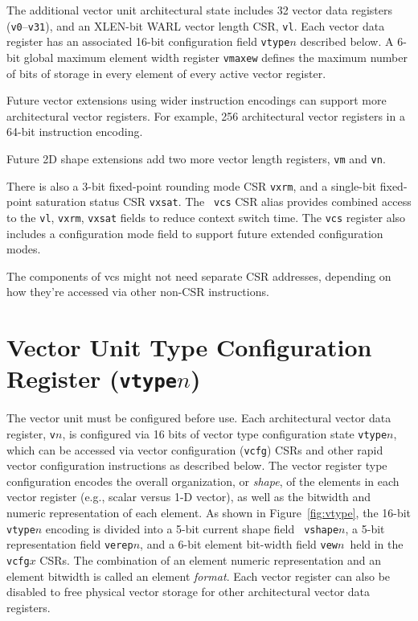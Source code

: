 The additional vector unit architectural state includes 32 vector data
registers ({\tt v0}--{\tt v31}), and an XLEN-bit WARL vector length
CSR, {\tt vl}.  Each vector data register has an associated 16-bit
configuration field {\tt vtype}$n$ described below. A 6-bit global
maximum element width register {\tt vmaxew} defines the maximum number
of bits of storage in every element of every active vector register.

\begin{commentary}
  Future vector extensions using wider instruction encodings can
  support more architectural vector registers. For example, 256
  architectural vector registers in a 64-bit instruction encoding.
\end{commentary}

\begin{commentary}
  Future 2D shape extensions add two more vector length registers,
  {\tt vm} and {\tt vn}.
\end{commentary}

There is also a 3-bit fixed-point rounding mode CSR {\tt vxrm}, and a
single-bit fixed-point saturation status CSR {\tt vxsat}.  The {\tt
  vcs} CSR alias provides combined access to the {\tt vl}, {\tt vxrm},
{\tt vxsat} fields to reduce context switch time.  The {\tt vcs}
register also includes a configuration mode field to support future
extended configuration modes.

\begin{discussion}
The components of vcs might not need separate CSR addresses,
depending on how they're accessed via other non-CSR instructions.
\end{discussion}

\section{Vector Unit Type Configuration Register ({\tt vtype}$n$)}

The vector unit must be configured before use.  Each architectural
vector data register, {\tt v}$n$, is configured via 16 bits of vector
type configuration state {\tt vtype}$n$, which can be accessed via
vector configuration ({\tt vcfg}) CSRs and other rapid vector
configuration instructions as described below.  The vector register
type configuration encodes the overall organization, or {\em shape},
of the elements in each vector register (e.g., scalar versus 1-D
vector), as well as the bitwidth and numeric representation of each
element.  As shown in Figure~\ref{fig:vtype}, the 16-bit {\tt
  vtype}$n$ encoding is divided into a 5-bit current shape field {\tt
  vshape}$n$, a 5-bit representation field {\tt verep}$n$, and a 6-bit
element bit-width field {\tt vew}$n$\, held in the {\tt vcfg}$x$ CSRs.
The combination of an element numeric representation and an element
bitwidth is called an element {\em format}.  Each vector register can
also be disabled to free physical vector storage for other
architectural vector data registers.

